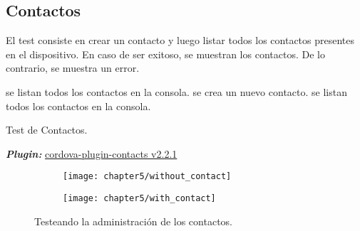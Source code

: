\subsection{Contactos}
El test consiste en crear un contacto y luego listar todos los contactos presentes en el dispositivo. En caso de ser exitoso, se muestran los contactos. De lo contrario, se muestra un error.\\
\begin{algorithm}
	\begin{algorithmic}[1]
		\STATE se listan todos los contactos en la consola.
		\STATE se crea un nuevo contacto.
		\STATE se listan todos los contactos en la consola.
	\end{algorithmic}
	\caption{Test de Contactos.}\label{alg:chap5:test_contactos}
\end{algorithm}
\textbf{\emph{Plugin:}} \href{https://www.npmjs.com/package/cordova-plugin-contacts}{cordova-plugin-contacts v2.2.1}
\begin{figure}[hbtp]
    \centering
    \begin{subfigure}{0.3\linewidth}
        \texttt{[image: chapter5/without\_contact]}
        \label{fig:chapter05:without_contact}
    \end{subfigure}
    \begin{subfigure}{0.3\linewidth}
        \texttt{[image: chapter5/with\_contact]}
        \label{fig:chapter05:with_contact}
    \end{subfigure}
    \caption{Testeando la administración de los contactos.}
	\label{fig:ch05:contacts-cases}
\end{figure}
\newpage
